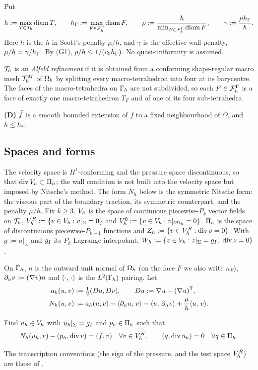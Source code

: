 Put
\[
h:=\max_{T\in\mathcal T_h}\operatorname{diam} T,\qquad h_\Gamma:=\max_{F\in\mathcal F_h^\Gamma}\operatorname{diam} F,\qquad \rho:=\frac h{\min_{F\in\mathcal F_h^\Gamma}\operatorname{diam} F},\qquad \gamma:=\frac{\mu h_\Gamma}h .
\]
Here $h$ is the $h$ in Scott's penalty $\mu/h$, and $\gamma$ is the effective wall penalty, $\mu/h=\gamma/h_\Gamma$. By (G1), $\rho/h\le1/(c_0h_\Gamma)$. No quasi-uniformity is assumed.

\begin{definition}\label{set:alfeld}
$\mathcal T_h$ is an \emph{Alfeld refinement} if it is obtained from a conforming shape-regular macro mesh $\mathcal T_h^M$ of $\Omega_h$ by splitting every macro-tetrahedron into four at its barycentre. The faces of the macro-tetrahedra on $\Gamma_h$ are not subdivided, so each $F\in\mathcal F_h^\Gamma$ is a face of exactly one macro-tetrahedron $T_F$ and of one of its four sub-tetrahedra.
\end{definition}

\textbf{(D)} $\tilde f$ is a smooth bounded extension of $f$ to a fixed neighbourhood of $\overline\Omega$, and $h\le h_\ast$.

\subsection{Spaces and forms}
The velocity space is $H^1$-conforming and the pressure space discontinuous, so that $\operatorname{div}V_h\subset\Pi_h$; the wall condition is not built into the velocity space but imposed by Nitsche's method. The form $N_h$ below is the symmetric Nitsche form: the viscous part of the boundary traction, its symmetric counterpart, and the penalty $\mu/h$.
Fix $k\ge3$. $V_h$ is the space of continuous piecewise-$P_k$ vector fields on $\mathcal T_h$, $V_h^R:=\{v\in V_h:v|_\Sigma=0\}$ and $V_h^0:=\{v\in V_h:v|_{\partial\Omega_h}=0\}$. $\Pi_h$ is the space of discontinuous piecewise-$P_{k-1}$ functions and $Z_h:=\{v\in V_h^R:\operatorname{div} v=0\}$. With $g:=u|_\Sigma$ and $g_I$ its $P_k$ Lagrange interpolant, $W_h:=\{z\in V_h:z|_\Sigma=g_I,\ \operatorname{div} z=0\}$.

On $\Gamma_h$, $n$ is the outward unit normal of $\Omega_h$ (on the face $F$ we also write $n_F$), $\partial_n v:=(\nabla v)n$ and $\langle \cdot,\, \cdot\rangle$ is the $L^2(\Gamma_h)$ pairing. Let
\begin{align*}
a_h(u,v)&:=\tfrac12(Du,Dv),\qquad Du:=\nabla u+(\nabla u)^{\mathsf T},\\
N_h(u,v)&:=a_h(u,v)-\langle \partial_n u,\, v\rangle-\langle u,\, \partial_n v\rangle+\frac\mu h\langle u,\, v\rangle .
\end{align*}

\begin{definition}\label{set:GS}
Find $u_h\in V_h$ with $u_h|_\Sigma=g_I$ and $p_h\in\Pi_h$ such that
\[
N_h(u_h,v)-(p_h,\operatorname{div} v)=(\tilde f,v)\quad\forall v\in V_h^R,\qquad (q,\operatorname{div} u_h)=0\quad\forall q\in\Pi_h .
\]
\end{definition}
The transcription conventions (the sign of the pressure, and the test space $V_h^R$) are those of \cite{PadhiLong2D}.

